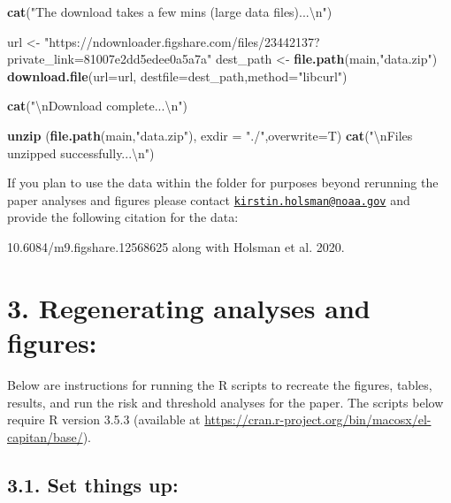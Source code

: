 \documentclass[]{article}
\newenvironment{Shaded}{\begin{snugshade}}{\end{snugshade}}
\newcommand{\KeywordTok}[1]{\textcolor[rgb]{0.13,0.29,0.53}{\textbf{{#1}}}}
\newcommand{\DataTypeTok}[1]{\textcolor[rgb]{0.13,0.29,0.53}{{#1}}}
\newcommand{\CharTok}[1]{\textcolor[rgb]{0.31,0.60,0.02}{{#1}}}
\newcommand{\StringTok}[1]{\textcolor[rgb]{0.31,0.60,0.02}{{#1}}}
\newcommand{\NormalTok}[1]{{#1}}
\begin{document}
\begin{Shaded}
\begin{Highlighting}[]
    \KeywordTok{cat}\NormalTok{(}\StringTok{"The download takes a few mins (large data files)...}\CharTok{\textbackslash{}n}\StringTok{"}\NormalTok{)}

    \NormalTok{url <-}\StringTok{  "https://ndownloader.figshare.com/files/23442137?private_link=81007e2dd5edee0a5a7a"}
    \NormalTok{dest_path  <-}\StringTok{  }\KeywordTok{file.path}\NormalTok{(main,}\StringTok{"data.zip"}\NormalTok{)}
    \KeywordTok{download.file}\NormalTok{(}\DataTypeTok{url=}\NormalTok{url, }\DataTypeTok{destfile=}\NormalTok{dest_path,}\DataTypeTok{method=}\StringTok{"libcurl"}\NormalTok{)}
    
    \KeywordTok{cat}\NormalTok{(}\StringTok{"}\CharTok{\textbackslash{}n}\StringTok{Download complete...}\CharTok{\textbackslash{}n}\StringTok{"}\NormalTok{)}
    
    \KeywordTok{unzip} \NormalTok{(}\KeywordTok{file.path}\NormalTok{(main,}\StringTok{"data.zip"}\NormalTok{), }\DataTypeTok{exdir =} \StringTok{"./"}\NormalTok{,}\DataTypeTok{overwrite=}\NormalTok{T)}
    \KeywordTok{cat}\NormalTok{(}\StringTok{"}\CharTok{\textbackslash{}n}\StringTok{Files unzipped successfully...}\CharTok{\textbackslash{}n}\StringTok{"}\NormalTok{)}
\end{Highlighting}
\end{Shaded}

If you plan to use the data within the folder for purposes beyond
rerunning the paper analyses and figures please contact
\href{mailto:kirstin.holsman@noaa.gov}{\nolinkurl{kirstin.holsman@noaa.gov}}
and provide the following citation for the data:

10.6084/m9.figshare.12568625 along with Holsman et al. 2020.

\section{3. Regenerating analyses and
figures:}\label{regenerating-analyses-and-figures}

Below are instructions for running the R scripts to recreate the
figures, tables, results, and run the risk and threshold analyses for
the paper. The scripts below require R version 3.5.3 (available at
\url{https://cran.r-project.org/bin/macosx/el-capitan/base/}).

\subsection{3.1. Set things up:}\label{set-things-up}
\end{document}
